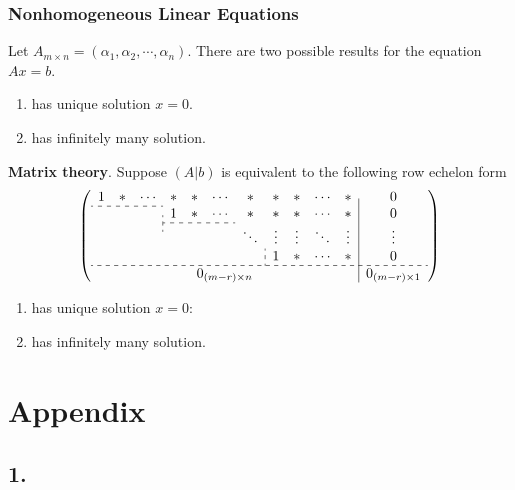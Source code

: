 \documentclass{report}
\theoremstyle{nonumberplain}
\begin{document}
\subsection{Nonhomogeneous Linear Equations}
Let $A_{m\times n}=(\alpha_1,\alpha_2,\cdots,\alpha_n)$. There are two possible results for the equation $Ax=b$.
\begin{enumerate}
	\item has unique solution $x=0$.
	\item has infinitely many solution.
\end{enumerate}
\textbf{Matrix theory}.
Suppose $\left(A|b\right)$ is equivalent to the following row echelon form
\[
	\left(\begin{array}{ccccccccccc|c}
			1                              & *                                     & \cdots & *                 & * & \cdots & *      & *      & *      & \cdots & *      & 0      \\\cdashline{1-3}[3pt/3pt]
			\multicolumn{3}{c;{3pt/3pt}}{} & 1                                     & *      & \cdots            & * & *      & *      & \cdots & *      & 0                        \\\cdashline{4-6}[3pt/3pt]
			                               &                                       &        &                   &   &        & \ddots & \vdots & \vdots & \ddots & \vdots & \vdots \\
			\multicolumn{7}{c;{3pt/3pt}}{} & 1                                     & *      & \cdots            & * & 0                                                            \\\hdashline[3pt/3pt]
			                               & \multicolumn{9}{c}{0_{(m-r)\times n}} &        & 0_{(m-r)\times 1}
		\end{array}\right)
\]

\begin{enumerate}
	\item has unique solution $x=0$:
	\item has infinitely many solution.
\end{enumerate}

\chapter*{Appendix}



\section*{1.}


\newpage

\end{document}
